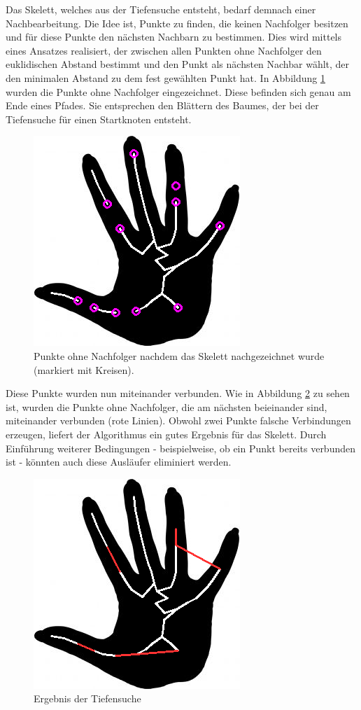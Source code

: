 Das Skelett, welches aus der Tiefensuche entsteht, bedarf demnach einer Nachbearbeitung. Die Idee ist, Punkte zu finden, die keinen Nachfolger besitzen und für diese Punkte den nächsten Nachbarn zu bestimmen. Dies wird mittels eines Ansatzes realisiert, der zwischen allen Punkten ohne Nachfolger den euklidischen Abstand bestimmt und den Punkt als nächsten Nachbar wählt, der den minimalen Abstand zu dem fest gewählten Punkt hat. In Abbildung \ref{fig:hand-punkte-ohne-nachfolger} wurden die Punkte ohne Nachfolger eingezeichnet. Diese befinden sich
genau am Ende eines Pfades. Sie entsprechen den Blättern des Baumes, der bei der Tiefensuche für einen Startknoten entsteht. 
\begin{figure}[htbp]
\centering
\includegraphics[width=0.4\linewidth]{./fig/hand-DFS-ohne-nachfolger}
\caption{Punkte ohne Nachfolger nachdem das Skelett nachgezeichnet wurde (markiert mit Kreisen).}
\label{fig:hand-punkte-ohne-nachfolger}
\end{figure}
Diese Punkte wurden nun miteinander verbunden. Wie in Abbildung \ref{fig:hand-DFS-endergebnis} zu sehen ist,
wurden die Punkte ohne Nachfolger, die am nächsten beieinander sind, miteinander verbunden (rote Linien). Obwohl zwei Punkte falsche Verbindungen erzeugen, liefert der Algorithmus ein gutes Ergebnis für das Skelett. Durch Einführung weiterer Bedingungen - beispielweise, ob ein Punkt bereits verbunden ist - könnten auch diese Ausläufer eliminiert werden. 
\begin{figure}[htbp]
\centering
\includegraphics[width=0.4\linewidth]{./fig/hand-DFS-endergebnis}
\caption{Ergebnis der Tiefensuche}
\label{fig:hand-DFS-endergebnis}
\end{figure}
